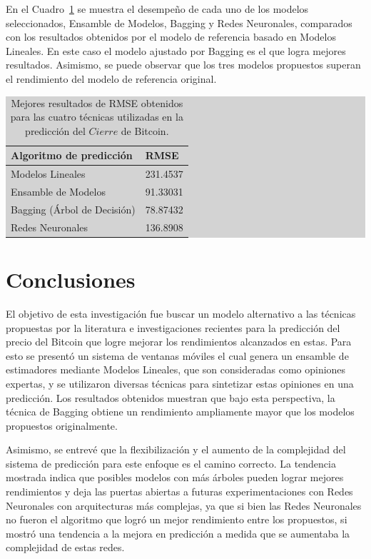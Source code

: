 \documentclass[a4paper,12pt,twocolumn]{article}
\begin{document}
En el Cuadro~\ref{RMSEFinal} se muestra el desempeño de cada uno de los modelos seleccionados, Ensamble de Modelos, Bagging y Redes Neuronales, comparados con los resultados obtenidos por el modelo de referencia basado en Modelos Lineales. En este caso el modelo ajustado por Bagging es el que logra mejores resultados. Asimismo, se puede observar que los tres modelos propuestos superan el rendimiento del modelo de referencia original.

\begin{table}[!hbt]
\centering
\caption{Mejores resultados de RMSE obtenidos para las cuatro técnicas utilizadas en la predicción del $Cierre$ de Bitcoin. }
\label{RMSEFinal}
\begingroup\setlength{\fboxsep}{0pt}
\colorbox{lightgray}{%
\begin{tabular}{|l|l|}
\hline Algoritmo de predicción & RMSE \\
\hline Modelos Lineales & 231.4537\\
\hline Ensamble de Modelos & 91.33031\\
\hline Bagging (Árbol de Decisión)& 78.87432\\
\hline Redes Neuronales & 136.8908 \\
\hline
\end{tabular}%
}\endgroup
\end{table}


\section{Conclusiones}

El objetivo de esta investigación fue buscar un modelo alternativo a las técnicas propuestas por la literatura e investigaciones recientes para la predicción del precio del Bitcoin que logre mejorar los rendimientos alcanzados en estas. Para esto se presentó un sistema de ventanas móviles el cual genera un ensamble de estimadores mediante Modelos Lineales, que son consideradas como opiniones expertas, y se utilizaron diversas técnicas para sintetizar estas opiniones en una predicción. Los resultados obtenidos muestran que bajo esta perspectiva, la técnica de Bagging obtiene un rendimiento ampliamente mayor que los modelos propuestos originalmente.

Asimismo, se entrevé que la flexibilización y el aumento de la complejidad del sistema de predicción para este enfoque es el camino correcto. La tendencia mostrada indica que posibles modelos con más árboles pueden lograr mejores rendimientos y deja las puertas abiertas a futuras experimentaciones con Redes Neuronales con arquitecturas más complejas, ya que si bien las Redes Neuronales no fueron el algoritmo que logró un mejor rendimiento entre los propuestos, si mostró una tendencia a la mejora en predicción a medida que se aumentaba la complejidad de estas redes. 
\end{document}
